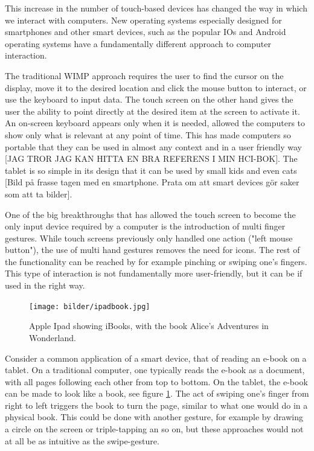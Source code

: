 This increase in the number of touch-based devices has changed the way in which we interact with computers. New operating systems especially designed for smartphones and other smart devices, such as the popular IOs and Android operating systems have a fundamentally different approach to computer interaction.

The traditional WIMP approach requires the user to find the cursor on the display, move it to the desired location and click the mouse button to interact, or use the keyboard to input data. The touch screen on the other hand gives the user the ability to point directly at the desired item at the screen to activate it. An on-screen keyboard appears only when it is needed, allowed the computers to show only what is relevant at any point of time. This has made computers so portable that they can be used in almost any context and in a user friendly way [JAG TROR JAG KAN HITTA EN BRA REFERENS I MIN HCI-BOK]. The tablet is so simple in its design that it can be used by small kids and even cats [Bild på frasse tagen med en smartphone. Prata om att smart devices gör saker som att ta bilder].

One of the big breakthroughs that has allowed the touch screen to become the only input device required by a computer is the introduction of multi finger gestures. While touch screens previously only handled one action ("left mouse button"), the use of multi hand gestures removes the need for icons. The rest of the functionality can be reached by for example pinching or swiping one's fingers. This type of interaction is not fundamentally more user-friendly, but it can be if used in the right way.

\begin{figure}[]
\texttt{[image: bilder/ipadbook.jpg]}
\caption{Apple Ipad showing iBooks, with the book Alice's Adventures in Wonderland.}
\label{ibooks}
\end{figure}
\nocite{ipadbook}

Consider a common application of a smart device, that of reading an e-book on a tablet. On a traditional computer, one typically reads the e-book as a document, with all pages following each other from top to bottom. On the tablet, the e-book can be made to look like a book, see figure \ref{ibooks}. The act of swiping one's finger from right to left triggers the book to turn the page, similar to what one would do in a physical book. This could be done with another gesture, for example by drawing a circle on the screen or triple-tapping an so on, but these approaches would not at all be as intuitive as the swipe-gesture.

